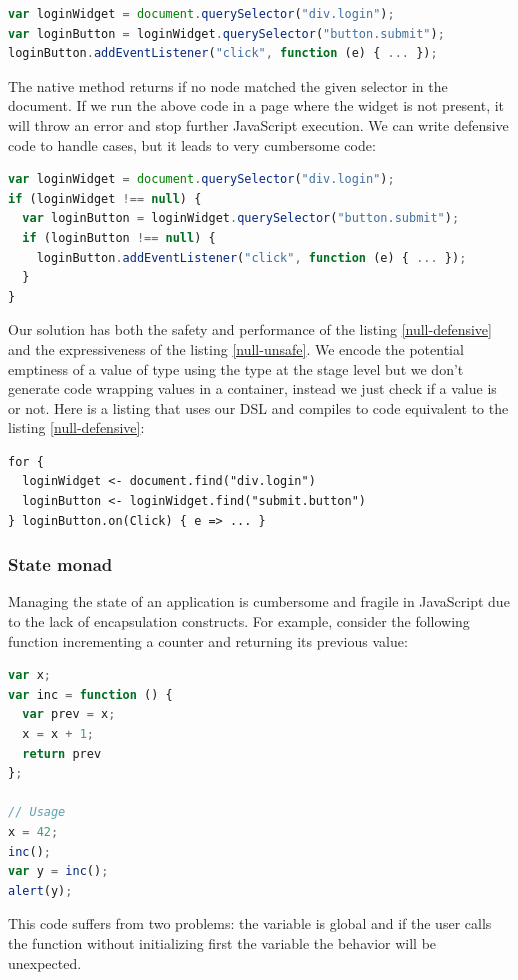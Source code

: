 \documentclass[american,english,runningheads]{llncs}
\begin{document}
\begin{lstlisting}[language=JavaScript,label=null-unsafe,caption=Unsafe code]
var loginWidget = document.querySelector("div.login");
var loginButton = loginWidget.querySelector("button.submit");
loginButton.addEventListener("click", function (e) { ... });
\end{lstlisting}

The native  method returns  if no node matched the given selector in the document. If
we run the above code in a page where the widget is not present, it will throw an error and stop further JavaScript
execution. We can write defensive code to handle  cases, but it leads to very cumbersome code:

\begin{lstlisting}[language=JavaScript,label=null-defensive,caption=Defensive programming to handle null references]
var loginWidget = document.querySelector("div.login");
if (loginWidget !== null) {
  var loginButton = loginWidget.querySelector("button.submit");
  if (loginButton !== null) {
    loginButton.addEventListener("click", function (e) { ... });
  }
}
\end{lstlisting}

Our solution has both the safety and performance of the listing \ref{null-defensive} and the expressiveness of the
listing \ref{null-unsafe}. We encode the potential emptiness of a value of type  using the
 type at the stage level but we don’t generate code wrapping values in a container, instead we
just check if a value is  or not. Here is a listing that uses our DSL and compiles to code equivalent to
the listing \ref{null-defensive}:

\begin{lstlisting}
for {
  loginWidget <- document.find("div.login")
  loginButton <- loginWidget.find("submit.button")
} loginButton.on(Click) { e => ... }
\end{lstlisting}

\subsubsection{State monad}

Managing the state of an application is cumbersome and fragile in JavaScript due to the lack of encapsulation
constructs. For example, consider the following function incrementing a counter and returning its previous value:
\begin{lstlisting}[language=JavaScript,label=state-fragile,caption=Fragile state handling]
var x;
var inc = function () {
  var prev = x;
  x = x + 1;
  return prev
};

// Usage
x = 42;
inc();
var y = inc();
alert(y);
\end{lstlisting}
This code suffers from two problems: the variable  is global and if the user calls the  function
without initializing first the  variable the behavior will be unexpected.
\end{document}
